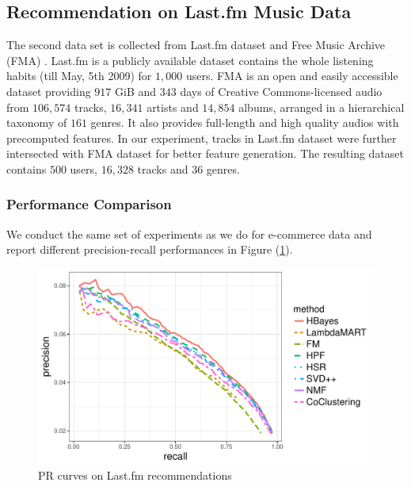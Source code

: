 \subsection{Recommendation on Last.fm Music Data}
The second data set is collected from Last.fm dataset \cite{Celma:Springer2010} and Free Music Archive (FMA) \cite{FMA}. Last.fm is a publicly available dataset contains the whole listening habits (till May, 5th 2009) for $1,000$ users. FMA is an open and easily accessible dataset providing $917$ GiB and $343$ days of Creative Commons-licensed audio from $106,574$ tracks, $16,341$ artists and $14,854$ albums, arranged in a hierarchical taxonomy of $161$ genres. It also provides full-length and high quality audios with precomputed features.  In our experiment, tracks in Last.fm dataset were further intersected with FMA dataset for better feature generation.  The resulting dataset contains $500$ users, $16,328$ tracks and $36$ genres.

\subsubsection{Performance Comparison}
We conduct the same set of experiments as we do for e-commerce data and report different precision-recall performances in Figure (\ref{fig:perf_cmp_music}).  


\begin{figure}[htb]
\includegraphics[width=0.9\columnwidth,height=0.5\columnwidth]{fig/Pre-recall_music}
\caption{PR curves on Last.fm recommendations}
\label{fig:perf_cmp_music}
\end{figure}

